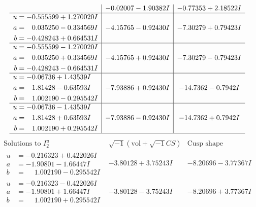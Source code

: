 \documentclass[1p]{elsarticle_modified}
\theoremstyle{definition}
\newcommand{\I}{\sqrt{-1}}
\begin{document}
$$\begin{array}{c|c|c}
 & -0.02007 - 1.90382 I & -0.77353 + 2.18522 I \\ \hline\begin{aligned}
u &= -0.555599 + 1.270020 I \\
a &= \phantom{-}0.035250 - 0.334569 I \\
b &= -0.428243 + 0.664531 I\end{aligned}
 & -4.15765 - 0.92430 I & -7.30279 + 0.79423 I \\ \hline\begin{aligned}
u &= -0.555599 - 1.270020 I \\
a &= \phantom{-}0.035250 + 0.334569 I \\
b &= -0.428243 - 0.664531 I\end{aligned}
 & -4.15765 + 0.92430 I & -7.30279 - 0.79423 I \\ \hline\begin{aligned}
u &= -0.06736 + 1.43539 I \\
a &= \phantom{-}1.81428 - 0.63593 I \\
b &= \phantom{-}1.002190 - 0.295542 I\end{aligned}
 & -7.93886 + 0.92430 I & -14.7362 - 0.7942 I \\ \hline\begin{aligned}
u &= -0.06736 - 1.43539 I \\
a &= \phantom{-}1.81428 + 0.63593 I \\
b &= \phantom{-}1.002190 + 0.295542 I\end{aligned}
 & -7.93886 - 0.92430 I & -14.7362 + 0.7942 I\\
 \hline 
 \end{array}$$\newpage$$\begin{array}{c|c|c}  
\text{Solutions to }I^u_{2}& \I (\text{vol} + \sqrt{-1}CS) & \text{Cusp shape}\\
 \hline 
\begin{aligned}
u &= -0.216323 + 0.422026 I \\
a &= -1.90801 - 1.66447 I \\
b &= \phantom{-}1.002190 - 0.295542 I\end{aligned}
 & -3.80128 + 3.75243 I & -8.20696 - 3.77367 I \\ \hline\begin{aligned}
u &= -0.216323 - 0.422026 I \\
a &= -1.90801 + 1.66447 I \\
b &= \phantom{-}1.002190 + 0.295542 I\end{aligned}
 & -3.80128 - 3.75243 I & -8.20696 + 3.77367 I \\ \hline\begin{aligned}

\end{aligned}
\end{array}$$
\end{document}
